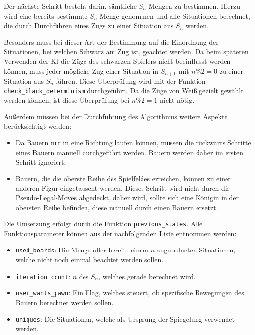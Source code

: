 \documentclass[a4paper,12pt]{article}
\providecommand{\tightlist}{%
      \setlength{\itemsep}{0pt}\setlength{\parskip}{0pt}}
\begin{document}
Der nächste Schritt besteht darin, sämtliche \(S_{n}\) Mengen zu
bestimmen. Hierzu wird eine bereits bestimmte \(S_n\) Menge genommen und
alle Situationen berechnet, die durch Durchführen eines Zugs zu einer
Situation aus \(S_n\) werden.

Besonders muss bei dieser Art der Bestimmung auf die Einordnung der
Situationen, bei welchen Schwarz am Zug ist, geachtet werden. Da beim
späteren Verwenden der KI die Züge des schwarzen Spielers nicht
beeinflusst werden können, muss jeder mögliche Zug einer Situation in
\(S_{n+1}\) mit \(n \% 2 = 0\) zu einer Situation aus \(S_n\) führen.
Diese Überprüfung wird mit der Funktion
\texttt{check\_black\_determinism} durchgeführt. Da die Züge von Weiß
gezielt gewählt werden können, ist diese Überprüfung bei \(n \% 2 = 1\)
nicht nötig.

Außerdem müssen bei der Durchführung des Algorithmus weitere Aspekte
berücksichtigt werden: 
\begin{itemize}
	\item Da Bauern nur in eine Richtung laufen können,
	müssen die rückwärts Schritte eines Bauern manuell durchgeführt werden.
	Bauern werden daher im ersten Schritt ignoriert. 
	\item Bauern, die die oberste Reihe des Spielfeldes erreichen, können zu einer anderen Figur
	eingetauscht werden. Dieser Schritt wird nicht durch die Pseudo-Legal-Moves abgedeckt, daher wird, sollte sich eine Königin in der obersten Reihe befinden, diese manuell durch einen Bauern ersetzt.
\end{itemize}

Die Umsetzung erfolgt durch die Funktion \texttt{previous\_states}. Alle
Funktionsparameter können aus der nachfolgenden Liste entnommen werden:

\begin{itemize}
\tightlist
\item
  \texttt{used\_boards}: Die Menge aller bereits einem \(n\)
  zugeordneten Situationen, welche nicht noch einmal beachtet werden
  sollen.
\item
  \texttt{iteration\_count}: \(n\) des \(S_n\), welches gerade berechnet
  wird.
\item
  \texttt{user\_wants\_pawn}: Ein Flag, welches steuert, ob spezifische
  Bewegungen des Bauern berechnet werden sollen.
\item
  \texttt{uniques}: Die Situationen, welche als Ursprung der Spiegelung
  verwendet werden.
\end{itemize}
\end{document}
